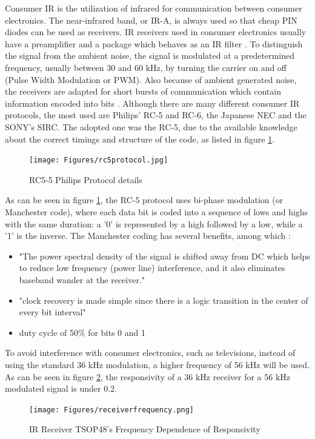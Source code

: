 Consumer IR is the utilization of infrared for communication between consumer electronics. The near-infrared band, or IR-A, is always used so that cheap PIN diodes can be used as receivers. IR receivers used in consumer electronics usually have a preamplifier and a package which behaves as an IR filter \citep{Vishay2013}. To distinguish the signal from the ambient noise, the signal is modulated at a predetermined frequency, usually between 30 and 60 kHz, by turning the carrier on and off (Pulse Width Modulation or PWM). Also because of ambient generated noise, the receivers are adapted for short bursts of communication which contain information encoded into bits \citep{Vishay2013}. 
Although there are many different consumer IR protocols, the most used are Philips' RC-5 and RC-6, the Japanese NEC and the SONY's SIRC. The adopted one was the RC-5, due to the available knowledge about the correct timings and structure of the code, as listed in figure \ref{fig:rc5protocol}.\\
\begin{figure}[!htb]
  \centering
  \texttt{[image: Figures/rc5protocol.jpg]}
  \caption[RC5-5 Philips Protocol details \citep{Infrarossidotit2009}]{RC5-5 Philips Protocol details \citep{Infrarossidotit2009}}
  \label{fig:rc5protocol}
\end{figure}

As can be seen in figure \ref{fig:rc5protocol}, the RC-5 protocol uses bi-phase modulation (or Manchester code), where each data bit is coded into a sequence of lows and highs with the same duration: a '0' is represented by a high followed by a low, while a '1' is the inverse. The Manchester coding has several benefits, among which \citep{Pauluzzi1992}:
\begin{itemize}
\item "The power spectral density of the signal is shifted away from DC which helps to reduce low frequency (power line) interference, and it also eliminates baseband wander at the receiver."
\item "clock recovery is made simple since there is a logic transition in the center of every bit interval"
\item duty cycle of 50\% for bits 0 and 1
\end{itemize}
To avoid interference with consumer electronics, such as televisions, instead of using the standard 36 kHz modulation, a higher frequency of 56 kHz will be used. As can be seen in figure \ref{fig:receiverfrequency}, the responsivity of a 36 kHz receiver for a 56 kHz modulated signal is under 0.2.\\
\begin{figure}[!htb]
  \centering
  \texttt{[image: Figures/receiverfrequency.png]}
  \caption[IR Receiver TSOP48's Frequency Dependence of Responsivity \citep{Vishay2015}]{IR Receiver TSOP48's Frequency Dependence of Responsivity \citep{Vishay2015}}
  \label{fig:receiverfrequency}
\end{figure}

